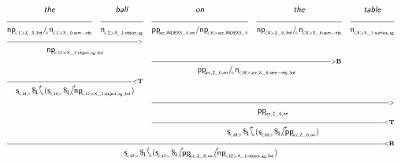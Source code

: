 \documentclass{article}
\newcommand{\deriv}[2]
{  \renewcommand{\arraystretch}{.5}
$\begin{array}[t]{*{#1}{c}}
     #2
   \end{array}$ }
\newcommand{\gf}[1]{\textsf{\textsl{#1}}}
\newcommand{\cf}[1]{\mbox{\ensuremath{\cfont{#1}}}}
\newcommand{\uline}[1]
{\mc{#1}{\hrulefill} }
\newcommand{\mc}[2]
  {\multicolumn{#1}{c}{#2}}
\newcommand{\cfont}{\mathsf}
\newcommand{\bs}{\backslash}
\newcommand{\subsa}[1]{\hspace{-0.75mm}_{_{#1}}}
\newcommand{\subsb}[1]{\hspace{-0.10mm}_{_{#1}}}
\newcommand{\subs}[1]{\hspace{-0.40mm}_{#1}}
\newcommand{\subsf}[1]{\hspace{-0.75mm}_{_{#1}}}
\newcommand{\supsa}[1]{\hspace{-1.75mm}^{^{#1}} }
\newcommand{\supsb}[1]{\hspace{-0.80mm}^{^{#1}}  }
\begin{document}
\deriv{5}{
\gf{the} & \gf{ball} & \gf{on} & \gf{the} & \gf{table} \\
\uline{1} & \uline{1} & \uline{1} & \uline{1} & \uline{1} \\
\cf{np \subsf{   < 1 >  Z \_ 0 ,  3rd } / \subsa{\diamond} n \subsf{   < 1 >  X \_ 0:sem-obj } } & \cf{n \subsf{   < 2 >  X \_ 1:object ,  sg } } & \cf{pp \subsf{  acc ,  INDEX3 \_ 4 ,  on } / np \subsf{   < 6 >  acc ,  INDEX3 \_ 4 } } & \cf{np \subsf{   < 8 >  Z \_ 6 ,  3rd } / \subsa{\diamond} n \subsf{   < 8 >  X \_ 6:sem-obj } } & \cf{n \subsf{   < 9 >  X \_ 7:surface ,  sg } } \\
 \mc{2} {\hrulefill_{>}} \\
 \mc{2}{\cf{np \subsf{   < 12 >  X \_ 1:object ,  sg ,  3rd } }} \\
&& \mc{2} {\hrulefill_{>\mathbf{B}}}\\
&& \mc{2}{\cf{pp \subsf{  acc ,  Z \_ 6 ,  on } / \subsa{\diamond} n \subsf{   < 18 >  acc ,  X \_ 6:sem-obj ,  3rd } }} \\
 \mc{2} {\hrulefill_{<\mathbf{T}}}\\
 \mc{2}{\cf{s \subsf{ < 14 > } \$ \subs{1}\bs \supsa{+} \hspace{-0.50mm} \subsb{i} (s \subsf{ < 14 > } \$ \subs{1}/ \supsb{+} \hspace{-1.45mm} \subsa{i} np \subsf{   < 12 >  X \_ 1:object ,  sg ,  3rd } )}} \\
&& \mc{3} {\hrulefill_{>}} \\
&& \mc{3}{\cf{pp \subsf{  acc ,  Z \_ 6 ,  on } }} \\
&& \mc{3} {\hrulefill_{<\mathbf{T}}}\\
&& \mc{3}{\cf{s \subsf{ < 28 > } \$ \subs{1}\bs \supsa{+} \hspace{-0.50mm} \subsb{i} (s \subsf{ < 28 > } \$ \subs{1}/ \supsb{+} \hspace{-1.45mm} \subsa{i} pp \subsf{  acc ,  Z \_ 6 ,  on } )}} \\
 \mc{5} {\hrulefill_{<\mathbf{B}}}\\
 \mc{5}{\cf{s \subsf{ < 42 > } \$ \subs{1}\bs \supsa{+} \hspace{-0.50mm} \subsb{i} (s \subsf{ < 42 > } \$ \subs{1}/ \supsb{+} \hspace{-1.45mm} \subsa{i} pp \subsf{  acc ,  Z \_ 6 ,  on } / \supsb{+} \hspace{-1.45mm} \subsa{i} np \subsf{   < 12 >  X \_ 1:object ,  sg ,  3rd } )}} \\
}

\vspace{5mm}
\end{document}
